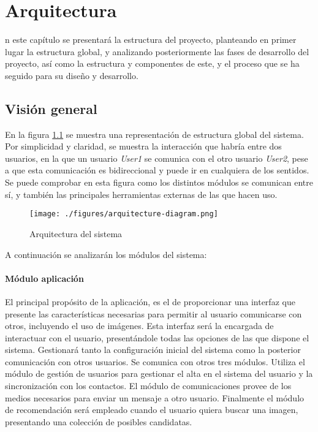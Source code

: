 \chapter{Arquitectura}
\label{chap:arquitectura}

\noindent
{}n este capítulo se presentará la estructura del proyecto, planteando en primer lugar la estructura global, y analizando posteriormente las fases de desarrollo del proyecto, así como la estructura y componentes de este, y el proceso que se ha seguido para su diseño y desarrollo. 

\section{Visión general}
En la figura \ref{fig:arquitecture-diagram} se muestra una representación de estructura global del sistema. Por simplicidad y claridad, se muestra la interacción que habría entre dos usuarios, en la que un usuario \textit{User1} se comunica con el otro usuario \textit{User2}, pese a que esta comunicación es bidireccional y puede ir en cualquiera de los sentidos. Se puede comprobar en esta figura como los distintos módulos se comunican entre sí, y también las principales herramientas externas de las que hacen uso.


\begin{figure}[!h]
\begin{center}
\texttt{[image: ./figures/arquitecture-diagram.png]}
\caption[Arquitectura del sistema]{Arquitectura del sistema}
\label{fig:arquitecture-diagram}
\end{center}
\end{figure}


A continuación se analizarán los módulos del sistema:


\subsubsection{Módulo aplicación}
El principal propósito de la aplicación, es el de proporcionar una interfaz que presente las características necesarias para permitir al usuario comunicarse con otros, incluyendo el uso de imágenes. Esta interfaz será la encargada de interactuar con el usuario, presentándole todas las opciones de las que dispone el sistema. Gestionará tanto la configuración inicial del sistema como la posterior comunicación con otros usuarios. Se comunica con otros tres módulos. Utiliza el módulo de gestión de usuarios para gestionar el alta en el sistema del usuario y la sincronización con los contactos. El módulo de comunicaciones provee de los medios necesarios para enviar un mensaje a otro usuario. Finalmente el módulo de recomendación será empleado cuando el usuario quiera buscar una imagen, presentando una colección de posibles candidatas.


